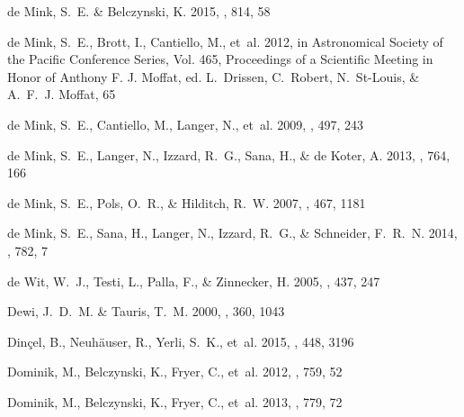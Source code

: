 \documentclass{aa}
\begin{document}
\begin{thebibliography}{242}
{de Mink}, S.~E. \& {Belczynski}, K. 2015, \apj, 814, 58

{de Mink}, S.~E., {Brott}, I., {Cantiello}, M., {et~al.} 2012, in Astronomical
  Society of the Pacific Conference Series, Vol. 465, Proceedings of a
  Scientific Meeting in Honor of Anthony F. J. Moffat, ed. L.~{Drissen},
  C.~{Robert}, N.~{St-Louis}, \& A.~F.~J. {Moffat}, 65

{de Mink}, S.~E., {Cantiello}, M., {Langer}, N., {et~al.} 2009, \aap, 497, 243

{de Mink}, S.~E., {Langer}, N., {Izzard}, R.~G., {Sana}, H., \& {de Koter}, A.
  2013, \apj, 764, 166

{de Mink}, S.~E., {Pols}, O.~R., \& {Hilditch}, R.~W. 2007, \aap, 467, 1181

{de Mink}, S.~E., {Sana}, H., {Langer}, N., {Izzard}, R.~G., \& {Schneider},
  F.~R.~N. 2014, \apj, 782, 7

{de Wit}, W.~J., {Testi}, L., {Palla}, F., \& {Zinnecker}, H. 2005, \aap, 437,
  247

{Dewi}, J.~D.~M. \& {Tauris}, T.~M. 2000, \aap, 360, 1043

{Din{\c c}el}, B., {Neuh{\"a}user}, R., {Yerli}, S.~K., {et~al.} 2015, \mnras,
  448, 3196

{Dominik}, M., {Belczynski}, K., {Fryer}, C., {et~al.} 2012, \apj, 759, 52

{Dominik}, M., {Belczynski}, K., {Fryer}, C., {et~al.} 2013, \apj, 779, 72


\end{thebibliography}
\end{document}
